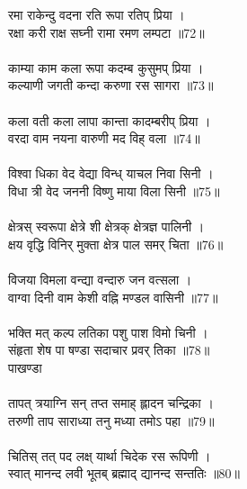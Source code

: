 रमा राकेन्दु वदना रति रूपा रतिप् प्रिया ।\\
रक्षा करी राक्ष सघ्नी रामा रमण लम्पटा ॥72॥\\
\\
काम्या काम कला रूपा कदम्ब कुसुमप् प्रिया ।\\
कल्याणी जगती कन्दा करुणा रस सागरा ॥73॥\\
\\
कला वती कला लापा कान्ता कादम्बरीप् प्रिया ।\\
वरदा वाम नयना वारुणी मद विह् वला ॥74॥\\
\\
विश्वा धिका वेद वेद्या विन्ध् याचल निवा सिनी ।\\
विधा त्री वेद जननी विष्णु माया विला सिनी ॥75॥\\
\\
क्षेत्रस् स्वरूपा क्षेत्रे शी क्षेत्रक् क्षेत्रज्ञ पालिनी ।\\
क्षय वृद्धि विनिर् मुक्ता क्षेत्र पाल समर् चिता ॥76॥\\
\\
विजया विमला वन्द्या वन्दारु जन वत्सला ।\\
वाग्वा दिनी वाम केशी वह्नि मण्डल वासिनी ॥77॥\\
\\
भक्ति मत् कल्प लतिका पशु पाश विमो चिनी ।\\
संहृता शेष पा षण्डा सदाचार प्रवर् तिका ॥78॥ \\
{\small{} पाखण्डा}\\
\\
तापत् त्रयाग्नि सन् तप्त समाह् ह्लादन चन्द्रिका ।\\
तरुणी ताप साराध्या तनु मध्या तमोऽ पहा ॥79॥\\
\\
चितिस् तत् पद लक्ष् यार्था चिदेक रस रूपिणी ।\\
स्वात् मानन्द लवी भूतब् ब्रह्माद् द्यानन्द सन्ततिः ॥80॥\\
